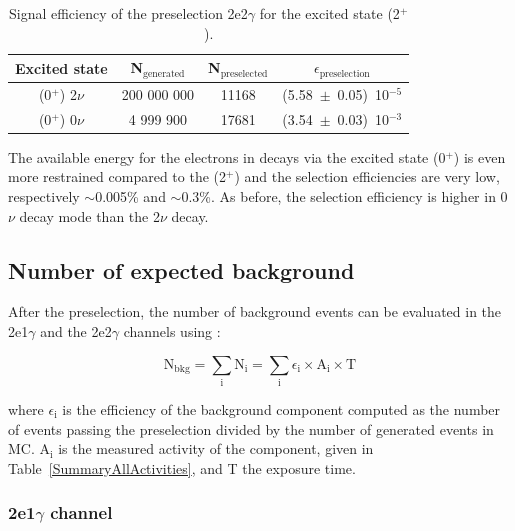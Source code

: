 \documentclass[main.tex]{subfiles}
\begin{document}
\begin{table}[h!]
\begin{center}
\begin{tabular}{c|c|c|c}
\toprule
Excited state & N$_\text{{generated}}$ & N$_\text{{preselected}}$ & $\epsilon_\text{{preselection}}$ \\[0.1cm]
\midrule
(0$^+$) 2$\nu$ & 200 000 000 & 11168 & (5.58~$\pm$~0.05)~10$^{-\text{5}}$\\[0.1cm]
(0$^+$) 0$\nu$ &   4 999 900 & 17681 & (3.54~$\pm$~0.03)~10$^{-\text{3}}$\\[0.1cm]
\bottomrule
\end{tabular}
\caption{Signal efficiency of the preselection 2e2$\gamma$ for the excited state (2$^+$).}
\label{EffPreselection0PLUS}
\end{center}
\end{table}


\NI The available energy for the electrons in decays via the excited state (0$^+$) is even more restrained compared to the (2$^+$) and the selection efficiencies are very low, respectively $\sim$0.005\% and $\sim$0.3\%. As before, the selection efficiency is higher in 0$\nu$ decay mode than the 2$\nu$ decay.  


\subsection{Number of expected background}


\NI After the preselection, the number of background events can be evaluated in the 2e1$\gamma$ and the 2e2$\gamma$ channels using :


\begin{equation}
\text{N}_{\text{bkg}} = \sum_\text{i} \text{N}_\text{i} = \sum_\text{i} \epsilon_\text{i} \times \text{A}_\text{i} \times \text{T}
\end{equation}


\smallskip


\NI where $\epsilon_\text{i}$ is the efficiency of the background component computed as the number of events passing the preselection divided by the number of generated events in MC. A$_\text{i}$ is the measured activity of the component, given in Table~\ref{SummaryAllActivities}, and T the exposure time.


\subsubsection{2e1$\gamma$ channel}
\end{document}
